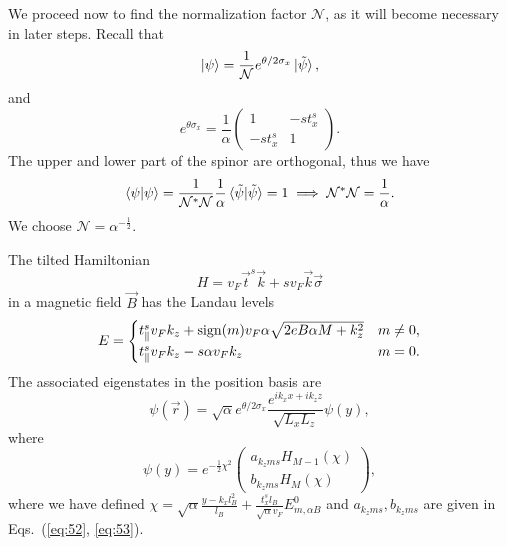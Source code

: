 We proceed now to find the normalization factor \( \mathcal{N} \), as it will become necessary in later steps.
Recall that
\[
  \ket{\psi} = \frac{1}{\mathcal{N}} e^{\theta /2 \sigma _x} \ket{\tilde{\psi}},
\]
and
\[
e^{\theta \sigma _x} =
\frac{1}{\alpha }
\begin{pmatrix}
  1 & -s t^s_x\\
  -s t^s_x & 1
\end{pmatrix}.
\]
The upper and lower part of the spinor are orthogonal, thus we have
\begin{equation}
  \label{eq:54}
  \braket{\psi  | \psi } = \frac{1}{\mathcal{N}^{*} \mathcal{N}} \frac{1}{\alpha } \braket{\tilde{\psi}  | \tilde{\psi} } = 1 \implies \mathcal{N}^{*}\mathcal{N} = \frac{1}{\alpha }.
\end{equation}
We choose \( \mathcal{N} = \alpha^{-\frac{1}{2}} \).

\begin{summary}\label{summary:llevels}
The tilted Hamiltonian
  \[
    H = v_F \vec{t}^s \vec{k} + s v_F \vec{k} \vec{\sigma}
  \]
  in a magnetic field \( \vec{B} \) has the Landau levels
  \[
    E =
    \begin{cases}
      t^s_{\parallel} v_F k_z + \operatorname{sign}(m) v_F \alpha \sqrt{2 e B \alpha M + k_{z} ^2} & m \neq 0,\\
      t^s_{\parallel} v_F k_z - s \alpha v_F k_z & m = 0.
    \end{cases}
  \]
  The associated eigenstates in the position basis are
  \[
    \psi(\vec{r}) = \sqrt{\alpha} e^{\theta /2 \sigma_x}
    \frac{
      e^{ik_{x} x + ik_{z} z}
    }{
      \sqrt{L_{x}  L_z}
    } \psi(y),
    \]
    where
    \[
      \psi(y) = e^{-\frac{1}{2} \chi^2}
      \begin{pmatrix}
        a_{k_z m s} H_{M - 1} (\chi) \\
        b_{k_z m s} H_M (\chi)
      \end{pmatrix},
    \]
    where we have defined \( \chi = \sqrt{\alpha} \frac{ y - k_x l_B^2 }{l_{B}} + \frac{t^s_x l_B}{\sqrt{\alpha} v_{F}} E^0_{m, \alpha B} \) and \( a_{k_z m s}, b_{k_z m s} \) are given in Eqs.~(\ref{eq:52}, \ref{eq:53}).
\end{summary}
